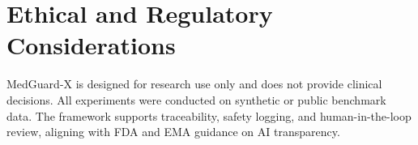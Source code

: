 \documentclass[letterpaper]{article} %
\begin{document}
\section{Ethical and Regulatory Considerations}
MedGuard-X is designed for research use only and does not provide clinical decisions.
All experiments were conducted on synthetic or public benchmark data.
The framework supports traceability, safety logging, and human-in-the-loop review, aligning with FDA and EMA guidance on AI transparency.

















% 
\end{document}
